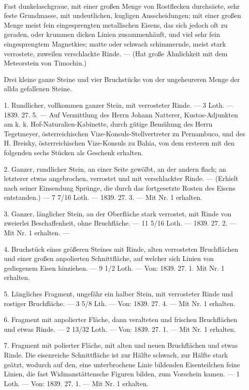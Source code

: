 \documentclass[a4paper, 11pt, oneside, polutonikogreek, german]{article}
\begin{document}
\paragraph{}
Fast dunkelaschgraue, mit einer großen Menge von Rostflecken durchsäete, sehr feste Grundmasse, mit undeutlichen, kugligen Ausscheidungen; mit einer großen Menge meist fein eingesprengten metallischen Eisens, das sich jedoch oft zu geraden, oder krummen dicken Linien zusammenhäuft, und viel sehr fein eingesprengtem Magnetkies; matte oder schwach schimmernde, meist stark verrostete, zuweilen verschlackte Rinde. — (Hat große Ähnlichkeit mit dem Meteorstein von Timochin.)

Drei kleine ganze Steine und vier Bruchstücke von der ungeheureren Menge der allda gefallenen Steine.

1. Rundlicher, vollkommen ganzer Stein, mit verrosteter Rinde. — 3 Loth. — 1839. 27. 5. — Auf Vermittlung des Herrn Johann Natterer, Kustos-Adjunkten am k. k. Hof-Naturalien-Kabinette, durch gütige Bemühung des Herrn Tegetmeyer, österreichischen Vize-Konsuls-Stellvertreter zu Pernambuco, und des H. Breisky, österreichischen Vize-Konsuls zu Bahia, von dem ersteren mit den folgenden sechs Stücken als Geschenk erhalten.

2. Ganzer, rundlicher Stein, an einer Seite gewölbt, an der andern flach; an letzterer etwas angebrochen, verrostet und mit verschlackter Rinde. — (Erhielt nach seiner Einsendung Sprünge, die durch das fortgesetzte Rosten des Eisens entstanden.) — 7 7/16 Loth. — 1839. 27. 3. — Mit Nr. 1 erhalten.

3. Ganzer, länglicher Stein, an der Oberfläche stark verrostet, mit Rinde von zweierlei Beschaffenheit, ohne Bruchfläche. — 11 5/16 Loth. — 1839. 27. 2. — Mit Nr. 1 erhalten. —

4. Bruchstück eines größeren Steines mit Rinde, alten verrosteten Bruchflächen und einer großen anpolierten Schnittfläche, auf welcher sich Linien von gediegenem Eisen hinziehen. — 9 1/2 Loth. — Von: 1839. 27. 1. Mit Nr. 1 erhalten.

5. Längliches Fragment, ungefähr ein halber Stein, mit verrosteter Rinde und rostiger Bruchfläche. — 3 5/8 Lth. — Von: 1839. 27. 4. — Mit Nr. 1 erhalten.

6. Fragment mit anpolierter Fläche, dann veralteten und frischen Bruchflächen und etwas Rinde. — 2 13/32 Loth. — Von: 1839. 27. 1. — Mit Nr. 1 erhalten.

7. Fragment mit polierter Fläche, mit alten und neuen Bruchflächen und etwas Rinde. Die eisenreiche Schnittfläche ist zur Hälfte schwach, zur Hälfte stark geätzt, wodurch auf den, eine unterbrochene Linie bildenden Eisenteilchen feine Linien, die fast Widmanstättensche Figuren bilden, zum Vorschein kamen. — 1 Loth. — Von: 1839. 27. 1. — Mit Nr. 1 erhalten.
\end{document}
